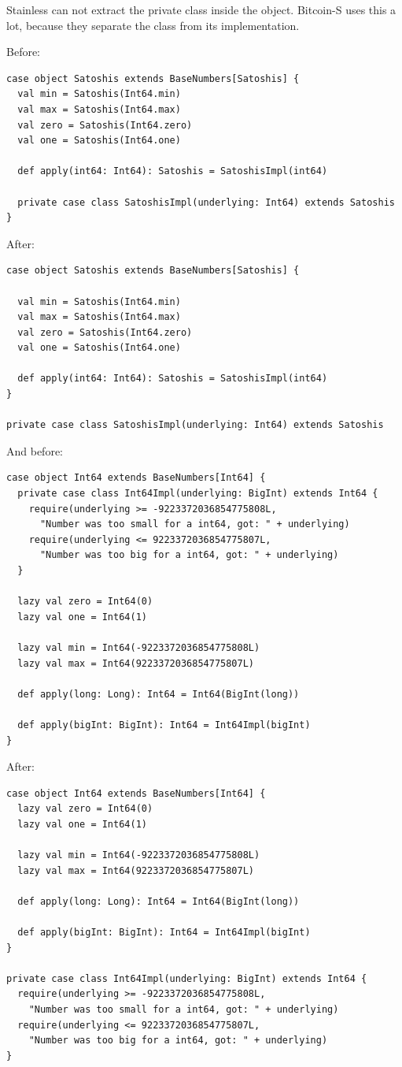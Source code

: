 \documentclass[runningheads]{llncs}
\begin{document}
Stainless can not extract the private class inside the object.
Bitcoin-S uses this a lot, because they separate the class from its implementation.

Before:
\begin{lstlisting}[style=scala]
case object Satoshis extends BaseNumbers[Satoshis] {
  val min = Satoshis(Int64.min)
  val max = Satoshis(Int64.max)
  val zero = Satoshis(Int64.zero)
  val one = Satoshis(Int64.one)

  def apply(int64: Int64): Satoshis = SatoshisImpl(int64)

  private case class SatoshisImpl(underlying: Int64) extends Satoshis
}
\end{lstlisting}

After:
\begin{lstlisting}[style=scala]
case object Satoshis extends BaseNumbers[Satoshis] {

  val min = Satoshis(Int64.min)
  val max = Satoshis(Int64.max)
  val zero = Satoshis(Int64.zero)
  val one = Satoshis(Int64.one)

  def apply(int64: Int64): Satoshis = SatoshisImpl(int64)
}

private case class SatoshisImpl(underlying: Int64) extends Satoshis
\end{lstlisting}

And before:
\begin{lstlisting}[style=scala]
case object Int64 extends BaseNumbers[Int64] {
  private case class Int64Impl(underlying: BigInt) extends Int64 {
    require(underlying >= -9223372036854775808L,
      "Number was too small for a int64, got: " + underlying)
    require(underlying <= 9223372036854775807L,
      "Number was too big for a int64, got: " + underlying)
  }

  lazy val zero = Int64(0)
  lazy val one = Int64(1)

  lazy val min = Int64(-9223372036854775808L)
  lazy val max = Int64(9223372036854775807L)

  def apply(long: Long): Int64 = Int64(BigInt(long))

  def apply(bigInt: BigInt): Int64 = Int64Impl(bigInt)
}
\end{lstlisting}

After:
\begin{lstlisting}[style=scala]
case object Int64 extends BaseNumbers[Int64] {
  lazy val zero = Int64(0)
  lazy val one = Int64(1)

  lazy val min = Int64(-9223372036854775808L)
  lazy val max = Int64(9223372036854775807L)

  def apply(long: Long): Int64 = Int64(BigInt(long))

  def apply(bigInt: BigInt): Int64 = Int64Impl(bigInt)
}

private case class Int64Impl(underlying: BigInt) extends Int64 {
  require(underlying >= -9223372036854775808L,
    "Number was too small for a int64, got: " + underlying)
  require(underlying <= 9223372036854775807L,
    "Number was too big for a int64, got: " + underlying)
}
\end{lstlisting}
\end{document}
